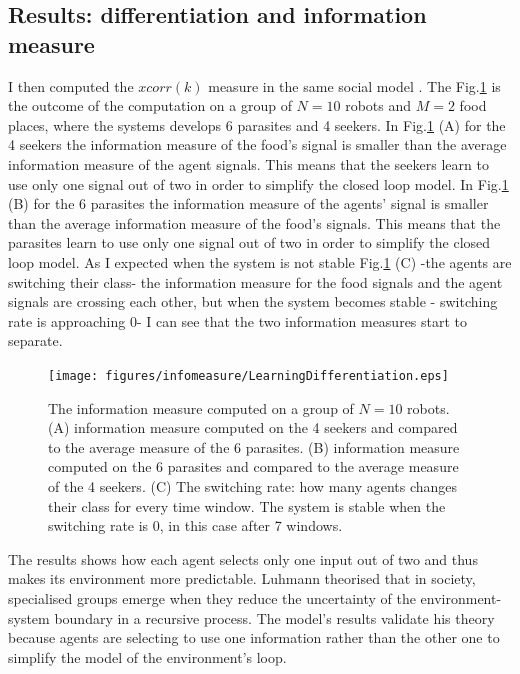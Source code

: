 \subsection{Results: differentiation and information measure}
I then computed the $xcorr(k)$ measure in the same social model \citep{DiProdiMultiAgent}.
The Fig.\ref{info:social} is the outcome of the computation on a
group of $N=10$ robots and $M=2$ food places, where the systems develops 6 parasites and 4 seekers.
In Fig.\ref{info:social} (A) for the 4 seekers
 the information measure of the food's signal is smaller than the average information
 measure of the agent signals. This means that the seekers learn to use only one
signal out of two in order to simplify the closed loop model.
In Fig.\ref{info:social} (B) for the 6 parasites the information measure of the
 agents' signal is smaller than the average information measure of the food's signals.
This means that the parasites learn to use only one signal out of two in order to
 simplify the closed loop model. As I expected when the system is not stable
 Fig.\ref{info:social} (C)  -the agents are switching their class-
the information measure for the food signals and the agent signals are
crossing each other, but when the system becomes stable - switching rate is
approaching 0- I can see that the two information measures start to separate.

\begin{figure}[htbp]
  \begin{center}
    \texttt{[image: figures/infomeasure/LearningDifferentiation.eps]}
    \caption[Max corr computed on the social system]{The information measure computed
      on a group of $N=10$ robots. (A) information measure computed on the 4 seekers
      and compared to the average measure of the 6 parasites. (B) information measure
      computed on the 6 parasites and compared to the average measure of the 4 seekers.
      (C) The switching rate: how many agents changes their class for every time window.
      The system is stable when the switching rate is 0, in this case after 7 windows.
      \label{info:social}}
  \end{center}
\end{figure}

The results shows how each agent selects only one input out of two and thus
makes its environment more predictable.
Luhmann theorised that in society, specialised groups emerge when they reduce
the uncertainty of the environment-system boundary in a recursive process.
The model's results validate his theory because agents are selecting to use one
information rather than the other one to simplify the model of the environment's loop.

